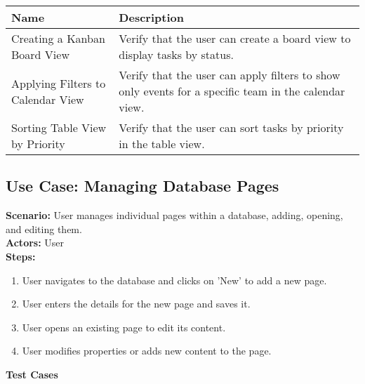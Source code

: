 \documentclass{article}
\begin{document}
            \begin{longtable}{|p{}|p{}|}
            \hline
            \textbf{Name} & \textbf{Description} \\
            \hline
            Creating a Kanban Board View & Verify that the user can create a board view to display tasks by status. \\
\hline
Applying Filters to Calendar View & Verify that the user can apply filters to show only events for a specific team in the calendar view. \\
\hline
Sorting Table View by Priority & Verify that the user can sort tasks by priority in the table view. \\
\hline
\end{longtable}\subsection{\textbf{Use Case: Managing Database Pages}}
\textbf{Scenario:} User manages individual pages within a database, adding, opening, and editing them.\\
\textbf{Actors:} User\\
\textbf{Steps:}
\begin{enumerate}
\item User navigates to the database and clicks on 'New' to add a new page.
\item User enters the details for the new page and saves it.
\item User opens an existing page to edit its content.
\item User modifies properties or adds new content to the page.
\end{enumerate}
\textbf{Test Cases}
\end{document}
